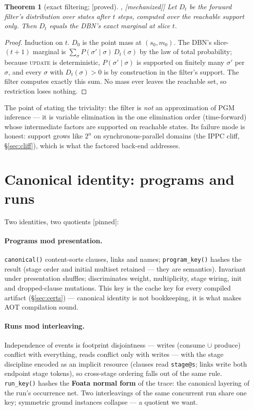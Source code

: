 \documentclass[11pt]{article}
\newcommand{\stproved}{[\textsf{proved}]}
\newcommand{\stmech}{[\textsf{mechanized}]}
\newcommand{\stpinned}{[\textsf{pinned}]}
\theoremstyle{plain}
\newtheorem{theorem}{Theorem}
\theoremstyle{definition}
\theoremstyle{remark}
\begin{document}
\begin{theorem}[exact filtering; \stproved{}, \stmech{}]
\label{thm:filter}
Let $D_t$ be the forward filter's distribution over states after $t$
steps, computed over the reachable support only. Then $D_t$ equals the
DBN's exact marginal at slice $t$.
\end{theorem}

\begin{proof}
Induction on $t$. $D_0$ is the point mass at $(s_0, m_0)$. The DBN's
slice-$(t{+}1)$ marginal is $\sum_\sigma P(\sigma' \mid \sigma)\,
D_t(\sigma)$ by the law of total probability; because \textsc{update} is
deterministic, $P(\sigma' \mid \sigma)$ is supported on finitely many
$\sigma'$ per $\sigma$, and every $\sigma$ with $D_t(\sigma) > 0$ is by
construction in the filter's support. The filter computes exactly this
sum. No mass ever leaves the reachable set, so restriction loses
nothing.
\end{proof}

The point of stating the triviality: the filter is \emph{not} an
approximation of PGM inference --- it is variable elimination in the one
elimination order (time-forward) whose intermediate factors are
supported on reachable states. Its failure mode is honest: support grows
like $2^n$ on synchronous-parallel domains (the IPPC cliff,
\S\ref{sec:cliff}), which is what the factored back-end addresses.

\section{Canonical identity: programs and runs}\label{sec:canonical}

Two identities, two quotients \stpinned{}:

\paragraph{Programs mod presentation.} \texttt{canonical()}
content-sorts clauses, links and names; \texttt{program\_key()} hashes
the result (stage order and initial multiset retained --- they are
semantics). Invariant under presentation shuffles; discriminates weight,
multiplicity, stage wiring, init and dropped-clause mutations. This key
is the cache key for every compiled artifact (\S\ref{sec:certs}) ---
canonical identity is not bookkeeping, it is what makes AOT compilation
sound.

\paragraph{Runs mod interleaving.} Independence of events is footprint
disjointness --- writes (consume $\cup$ produce) conflict with
everything, reads conflict only with writes --- with the stage
discipline encoded as an implicit resource (clauses read
\texttt{stage@s}; links write both endpoint stage tokens), so
cross-stage ordering falls out of the same rule. \texttt{run\_key()}
hashes the \textbf{Foata normal form} of the trace: the canonical
layering of the run's occurrence net. Two interleavings of the same
concurrent run share one key; symmetric ground instances collapse --- a
quotient we want.
\end{document}
